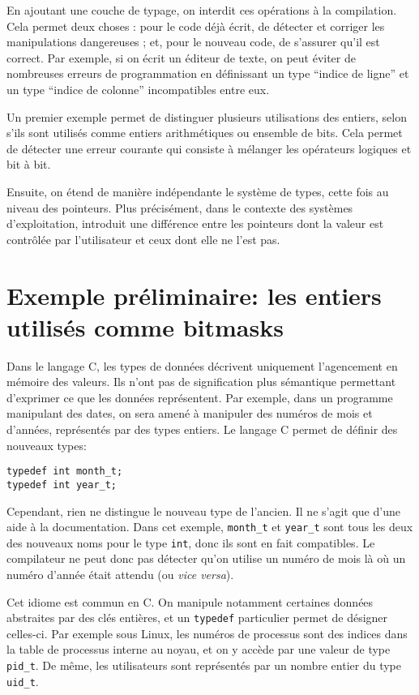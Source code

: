 En ajoutant une couche de typage, on interdit ces opérations à la compilation.
Cela permet deux choses : pour le code déjà écrit, de détecter et corriger les
manipulations dangereuses ; et, pour le nouveau code, de s'assurer qu'il est
correct. Par exemple, si on écrit un éditeur de texte, on peut éviter de
nombreuses erreurs de programmation en définissant un type \enquote{indice de
ligne} et un type \enquote{indice de colonne} incompatibles entre eux.

Un premier exemple permet de distinguer plusieurs utilisations des entiers,
selon s'ils sont utilisés comme entiers arithmétiques ou ensemble de bits. Cela
permet de détecter une erreur courante qui consiste à mélanger les opérateurs
logiques et bit à bit.

Ensuite, on étend de manière indépendante le système de types, cette fois au
niveau des pointeurs. Plus précisément, dans le contexte des systèmes
d'exploitation, introduit une différence entre les pointeurs dont la valeur est
contrôlée par l'utilisateur et ceux dont elle ne l'est pas.

\section{Exemple préliminaire: les entiers utilisés comme bitmasks}

Dans le langage C, les types de données décrivent uniquement l'agencement en
mémoire des valeurs. Ils n'ont pas de signification plus sémantique permettant
d'exprimer ce que les données représentent. Par exemple, dans un programme
manipulant des dates, on sera amené à manipuler des numéros de mois et d'années,
représentés par des types entiers. Le langage C permet de définir des nouveaux
types:

\begin{verbatim}
typedef int month_t;
typedef int year_t;
\end{verbatim}

Cependant, rien ne distingue le nouveau type de l'ancien. Il ne s'agit que d'une
aide à la documentation. Dans cet exemple, \texttt{month\_t} et \texttt{year\_t}
sont tous les deux des nouveaux noms pour le type \texttt{int}, donc ils sont en
fait compatibles. Le compilateur ne peut donc pas détecter qu'on utilise un
numéro de mois là où un numéro d'année était attendu (ou \emph{vice versa}).

Cet idiome est commun en C. On manipule notamment certaines données abstraites
par des clés entières, et un \texttt{typedef} particulier permet de désigner
celles-ci. Par exemple sous Linux, les numéros de processus sont des indices
dans la table de processus interne au noyau, et on y accède par une valeur de
type \texttt{pid\_t}. De même, les utilisateurs sont représentés par un nombre
entier du type \texttt{uid\_t}.

